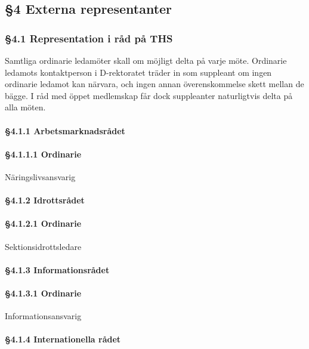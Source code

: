 \subsection{§4 Externa representanter}

\subsubsection{§4.1 Representation i råd på THS}

Samtliga ordinarie ledamöter skall om möjligt delta på varje möte. Ordinarie ledamots kontaktperson i D-rektoratet träder in som suppleant om ingen ordinarie ledamot kan närvara, och ingen annan överenskommelse skett mellan de bägge. I råd med öppet medlemskap får dock suppleanter naturligtvis delta på alla möten.

\paragraph{§4.1.1 Arbetsmarknadsrådet}

\paragraph{§4.1.1.1 Ordinarie}

Näringslivsansvarig

\paragraph{§4.1.2 Idrottsrådet}

\paragraph{§4.1.2.1 Ordinarie}

Sektionsidrottsledare

\paragraph{§4.1.3 Informationsrådet}

\paragraph{§4.1.3.1 Ordinarie}

Informationsansvarig

\paragraph{§4.1.4 Internationella rådet}

